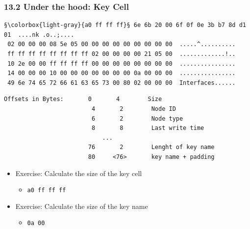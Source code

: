 \begin{frame}[fragile]
  \frametitle{13.2 Under the hood: Key Cell}
  \begin{lstlisting}[basicstyle=\tiny,escapechar=§]
 §\colorbox{light-gray}{a0 ff ff ff}§ 6e 6b 20 00 6f 0f 0e 3b b7 8d d1 01  ....nk .o..;....
 02 00 00 00 08 5e 05 00 00 00 00 00 00 00 00 00  .....^..........
 ff ff ff ff ff ff ff ff 02 00 00 00 00 21 05 00  .............!..
 10 2e 00 00 ff ff ff ff 00 00 00 00 00 00 00 00  ................
 14 00 00 00 10 00 00 00 00 00 00 00 0a 00 00 00  ................
 49 6e 74 65 72 66 61 63 65 73 00 80 02 00 00 00  Interfaces......
  \end{lstlisting}
  \begin{lstlisting}[basicstyle=\tiny]
 Offsets in Bytes:       0       4        Size
                         4       2        Node ID
                         6       2        Node type
                         8       8        Last write time
                            ...
                        76       2        Lenght of key name
                        80     <76>       key name + padding
  \end{lstlisting}
  \begin{itemize}
      \item Exercise: Calculate the size of the key cell
      \begin{itemize}
          \item[] \texttt{a0 ff ff ff}
      \end{itemize}
      \item Exercise: Calculate the size of the key name
      \begin{itemize}
          \item[] \texttt{0a 00}
      \end{itemize}
  \end{itemize}
\end{frame}


